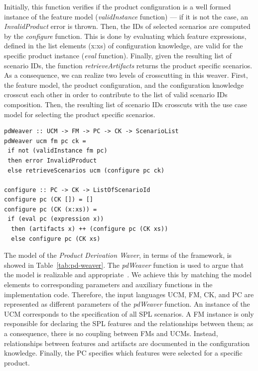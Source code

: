\documentclass{acm_proc_article-sp}
\begin{document}
Initially, this function verifies if the product configuration is a well formed instance of the feature model (\emph{validInstance} function) --- if it is not the case,  an \emph{InvalidProduct} error is thrown. Then, the IDs of selected scenarios are computed by the \emph{configure} function. This is done by evaluating which feature expressions, defined in the list elements (x:xs) of configuration knowledge, are valid for the specific product instance (\emph{eval} function). Finally, given the resulting list of scenario IDs, the function \emph{retrieveArtifacts} returns the product specific scenarios. 
As a consequence, we can realize two levels of crosscutting in this weaver. First, the feature model, the product configuration, and the configuration knowledge crosscut each other in order to contribute to the list of valid scenario IDs composition. Then, the resulting list of scenario IDs crosscuts with the use case model for selecting the product specific scenarios.    

\begin{lstlisting}[belowskip=20pt,frame=tb,caption={Product derivation weaver function},label=lst:configure]
pdWeaver :: UCM -> FM -> PC -> CK -> ScenarioList
pdWeaver ucm fm pc ck = 
 if not (validInstance fm pc) 
 then error InvalidProduct
 else retrieveScenarios ucm (configure pc ck)

configure :: PC -> CK -> ListOfScenarioId
configure pc (CK []) = []
configure pc (CK (x:xs)) =
 if (eval pc (expression x))
  then (artifacts x) ++ (configure pc (CK xs))
  else configure pc (CK xs)
\end{lstlisting}

The model of the \emph{Product Derivation Waver}, 
in terms of the framework, is showed in Table~\ref{tab:pd-weaver}. The \emph{pdWeaver} function is used to argue that the model is realizable and appropriate~\cite{kiczales-ecoop-2003}. We achieve this by matching the model elements 
to corresponding parameters and auxiliary functions in the implementation code. Therefore, the input languages UCM, FM, CK, and PC are represented as different parameters 
of the \emph{pdWeaver} function. An instance of the UCM corresponds to the specification of all 
SPL scenarios. A FM instance is only responsible for declaring the SPL features and the relationships between 
them; as a consequence, there is no coupling between FMs and UCMs. Instead, relationships between features and artifacts are documented in the configuration knowledge. Finally, the PC specifies which features were selected 
for a specific product. 
\end{document}
